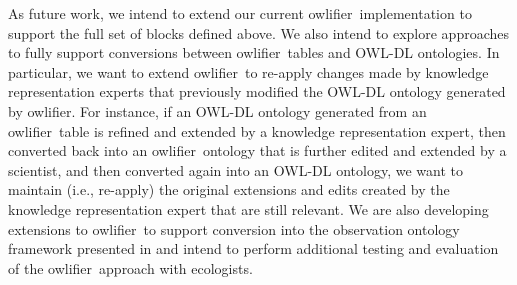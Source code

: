 \documentclass[5p,authoryear]{elsarticle}
\newcommand{\owlifier}{\textsf{owlifier}}
\begin{document}
As future work, we intend to extend our current \owlifier\
implementation to support the full set of blocks defined above. We
also intend to explore approaches to fully support conversions between
\owlifier\ tables and OWL-DL ontologies. In particular, we want to
extend \owlifier\ to re-apply changes made by knowledge representation
experts that previously modified the OWL-DL ontology generated by
\owlifier. For instance, if an OWL-DL ontology generated from an
\owlifier\ table is refined and extended by a knowledge representation
expert, then converted back into an \owlifier\ ontology that is
further edited and extended by a scientist, and then converted again
into an OWL-DL ontology, we want to maintain (i.e., re-apply) the
original extensions and edits created by the knowledge representation
expert that are still relevant. We are also developing extensions to
\owlifier\ to support conversion into the observation ontology
framework presented in \cite{bowers08:_concep_model_framew_for_expres}
and intend to perform additional testing and evaluation of the
\owlifier\ approach with ecologists.

%


\end{document}
